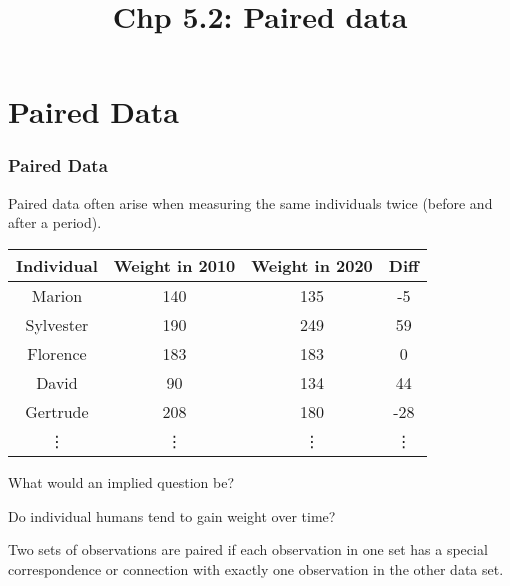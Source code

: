 \documentclass[slidestop,compress,mathserif]{beamer}
\title[Chp 5.2: Paired data]{Chp 5.2: Paired data}
\newcommand{\soln}[1]{#1}
\begin{document}
\section{Paired Data}
\begin{frame}
\frametitle{Paired Data}
Paired data often arise when measuring the same individuals twice (before and after a period). \pause
\begin{center}
\begin{tabular}{|c|c|c|c|} \hline
Individual & Weight in 2010 & Weight in 2020 & Diff \\ \hline
Marion & 140 & 135 & -5\\
Sylvester & 190 & 249 & 59\\
Florence & 183 & 183 & 0\\
David & 90  & 134 & 44\\
Gertrude & 208 & 180 & -28\\
\vdots&\vdots&\vdots & \vdots \\ \hline
\end{tabular}
\end{center}
What would an implied question be? \pause
\begin{center}
\soln{Do individual humans tend to gain weight over time?}
\vfill
\end{center} \pause
Two sets of observations are paired if each observation in one set has a special correspondence or connection with exactly one observation in the other data set.
\end{frame}
\end{document}
